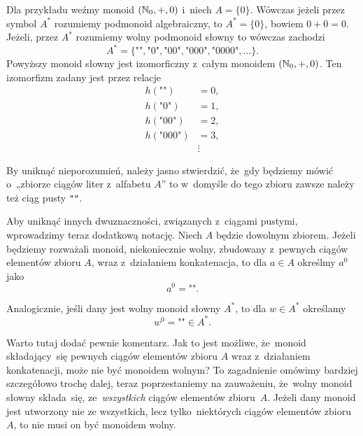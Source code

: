 \documentclass[a4paper,11pt]{article}
\begin{document}
Dla przykładu weźmy monoid $( \mathbb{N}_{ 0 }, +, 0)$ i~niech
$A = \{ 0 \}$. Wówczas jeżeli przez symbol $A^{ * }$ rozumiemy
podmonoid algebraiczny, to $A^{ * } = \{ 0 \}$, bowiem $0 + 0 = 0$.
Jeżeli, przez $A^{ * }$ rozumiemy wolny podmonoid słowny to wówczas
zachodzi
\begin{equation}
  \label{eq:Forys-Forys-12}
  A^{ * } = \{ \texttt{""}, \texttt{"} 0 \texttt{"},
  \texttt{"} 00 \texttt{"}, \texttt{"} 000 \texttt{"},
  \texttt{"} 0000 \texttt{"}, \ldots \}.
\end{equation}
Powyższy monoid słowny jest izomorficzny z~całym monoidem
$( \mathbb{N}_{ 0 }, +, 0)$. Ten izomorfizm zadany jest przez relacje
\begin{equation}
  \label{eq:Forys-Forys-13}
  \begin{split}
    h( \texttt{""} ) &= 0, \\
    h( \texttt{"} 0 \texttt{"} ) &= 1, \\
    h( \texttt{"} 0 0 \texttt{"} ) &= 2, \\
    h( \texttt{"} 0 0 0 \texttt{"} ) &= 3, \\
                     &\vdots
  \end{split}
\end{equation}

\vspace{\spaceFour}





\start {} By uniknąć nieporozumień, należy jasno stwierdzić,
że~gdy będziemy mówić o~„zbiorze ciągów liter z~alfabetu $A$” to
w~domyśle do tego zbioru zawsze należy też ciąg pusty \texttt{""}.

Aby uniknąć innych dwuznaczności, związanych z~ciągami pustymi,
wprowadzimy teraz dodatkową notację. Niech $A$ będzie dowolnym
zbiorem. Jeżeli będziemy rozważali monoid, niekoniecznie wolny,
zbudowany z~pewnych ciągów elementów zbioru $A$, wraz z~działaniem
konkatenacja, to dla $a \in A$ określmy $a^{ 0 }$ jako
\begin{equation}
  \label{eq:Forys-Forys-14}
  a^{ 0 } = \texttt{""}.
\end{equation}

Analogicznie, jeśli dany jest wolny monoid słowny $A^{ * }$, to dla
$w \in A^{ * }$ określamy
\begin{equation}
  \label{eq:Forys-Forys-15}
  w^{ 0 } = \texttt{""} \in A^{ * }.
\end{equation}

Warto tutaj dodać pewnie komentarz. Jak to jest możliwe, że~monoid
składający~się pewnych ciągów elementów zbioru $A$ wraz z~działaniem
konkatenacji, może nie być monoidem wolnym? To zagadnienie omówimy
bardziej szczegółowo trochę dalej, teraz poprzestaniemy na zauważeniu,
że~wolny monoid słowny składa~się, ze~\textit{wszystkich} ciągów
elementów zbioru~$A$. Jeżeli dany monoid jest utworzony nie ze
wszystkich, lecz tylko~niektórych ciągów elementów zbioru~$A$, to nie
musi on być monoidem wolny.
\end{document}
